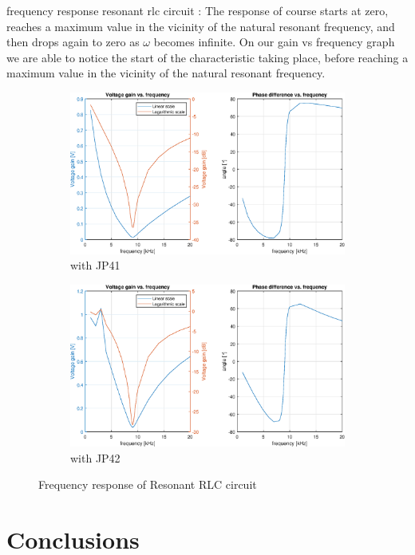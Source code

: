 \documentclass[notitlepage, a4paper, 11pt]{article}
\begin{document}
	frequency response resonant rlc circuit :
	The response of course starts at zero, reaches a maximum value in the vicinity of the natural resonant frequency, and then drops again to zero as $\omega$ becomes infinite. 
	On our  gain vs frequency graph we are able to notice the start of the characteristic taking place, before reaching a maximum value in the vicinity of the natural resonant frequency.
	
	\begin{figure}[H]
		\centering
		\begin{subfigure}{0.49\textwidth}
			\includegraphics[width=\textwidth]{../Matlab/img/131.eps}
			\caption{with JP41}
		\end{subfigure}
		\hfill
		\begin{subfigure}{0.49\textwidth}
			\includegraphics[width=\textwidth]{../Matlab/img/132.eps}
			\caption{with JP42}
		\end{subfigure}
		\caption{Frequency response of Resonant RLC circuit}
	\end{figure}
	\section{Conclusions}
	
\end{document}

